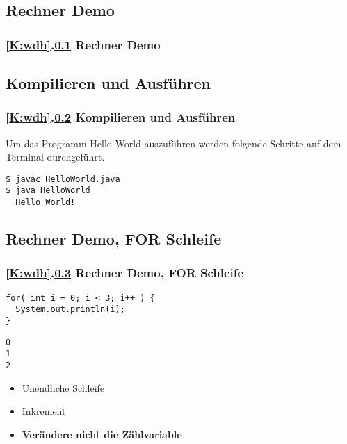 \def\stitle{Rechner Demo}
\subsection{\stitle}\label{S:RechnerDemo0}
\begin{frame}[fragile]%
  \frametitle{\ref{K:wdh}.\ref{S:RechnerDemo0} \stitle}%


\end{frame}


\def\stitle{Kompilieren und Ausführen}
\subsection{\stitle}\label{S:CompilierenUexec}
\begin{frame}[fragile]%
  \frametitle{\ref{K:wdh}.\ref{S:CompilierenUexec} \stitle}%

Um das Programm Hello World auszuführen werden folgende Schritte auf dem Terminal durchgeführt.

\begin{lstlisting}[style=BASH]
$ javac HelloWorld.java
$ java HelloWorld
  Hello World!
\end{lstlisting}

\end{frame}


\def\stitle{Rechner Demo, FOR Schleife}
\subsection{\stitle}\label{S:RechnerDemo}
\begin{frame}[fragile]%
  \frametitle{\ref{K:wdh}.\ref{S:RechnerDemo} \stitle}%


\begin{lstlisting}[title={Beispiel Programm},style=java, frame=single]
for( int i = 0; i < 3; i++ ) {
  System.out.println(i);
}
\end{lstlisting}
\bigskip

\begin{lstlisting}[title=output,style=java, frame=single]
0
1
2
\end{lstlisting}
\hfill

\begin{itemize}
\item Unendliche Schleife
\item Inkrement
\item \textbf{Verändere nicht die Zählvariable}
\end{itemize}
\end{frame}


